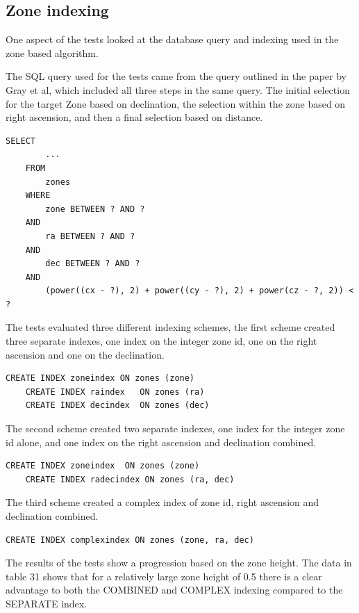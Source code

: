 \documentclass{article}
\begin{document}
\subsection{Zone indexing}
\label{zone-indexing}

One aspect of the tests looked at the database query and indexing used in the zone based algorithm.

The SQL query used for the tests came from the query outlined in the paper by Gray et al, which included all three steps in the same query. The initial selection for the target Zone based on declination, the selection within the zone based on right ascension, and then a final selection based on distance.

\begin{lstlisting}[style=SQL]
    SELECT
        ...
    FROM
        zones
    WHERE
        zone BETWEEN ? AND ?
    AND
        ra BETWEEN ? AND ?
    AND
        dec BETWEEN ? AND ?
    AND
        (power((cx - ?), 2) + power((cy - ?), 2) + power(cz - ?, 2)) < ?
\end{lstlisting}

The tests evaluated three different indexing schemes, the first scheme created three separate indexes, one index on the integer zone id, one on the right ascension and one on the declination.

\begin{lstlisting}[style=SQL]
    CREATE INDEX zoneindex ON zones (zone)
    CREATE INDEX raindex   ON zones (ra)
    CREATE INDEX decindex  ON zones (dec)
\end{lstlisting}

The second scheme created two separate indexes, one index for the integer zone id alone, and one index on the right ascension and declination combined.

\begin{lstlisting}[style=SQL]
    CREATE INDEX zoneindex  ON zones (zone)
    CREATE INDEX radecindex ON zones (ra, dec)
\end{lstlisting}

The third scheme created a complex index of zone id, right ascension and declination combined.

\begin{lstlisting}[style=SQL]
    CREATE INDEX complexindex ON zones (zone, ra, dec)
\end{lstlisting}

The results of the tests show a progression based on the zone height. The data in table 31 shows that for a relatively large zone height of 0.5 there is a clear advantage to both the COMBINED and COMPLEX indexing compared to the SEPARATE index.
\end{document}
